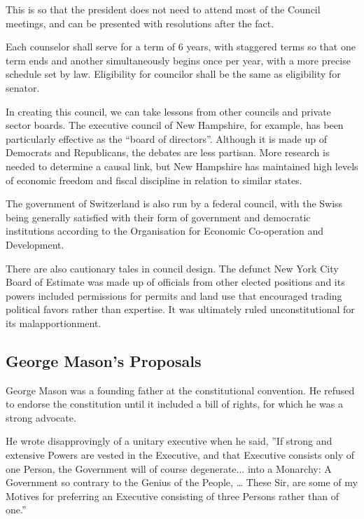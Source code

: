 \documentclass{article}
\begin{document}
This is so that the president does not need to attend most of the Council meetings, and can be presented with resolutions after the fact.

\begin{quoting}
Each counselor shall serve for a term of 6 years, with staggered terms so that one term ends and another simultaneously begins once per year, with a more precise schedule set by law. Eligibility for councilor shall be the same as eligibility for senator.
\end{quoting}

In creating this council, we can take lessons from other councils and private sector boards\cite{Khanna}. The executive council of New Hampshire, for example, has been particularly effective as the “board of directors”\cite{Hahn-Burkett}. Although it is made up of Democrats and Republicans, the debates are less partisan\cite{Timmins}. More research is needed to determine a causal link, but New Hampshire has maintained high levels of economic freedom and fiscal discipline in relation to similar states\cite{Ruger}.

The government of Switzerland is also run by a federal council, with the Swiss being generally satisfied with their form of government and democratic institutions according to the Organisation for Economic Co-operation and Development\cite{Kaufman}.

There are also cautionary tales in council design. The defunct New York City Board of Estimate was made up of officials from other elected positions and its powers included permissions for permits and land use that encouraged trading political favors rather than expertise\cite{Purnick}. It was ultimately ruled unconstitutional for its malapportionment\cite{Board_of_Estimate}.

\subsection{George Mason's Proposals}

George Mason was a founding father at the constitutional convention. He refused to endorse the constitution until it included a bill of rights, for which he was a strong advocate.

He wrote disapprovingly of a unitary executive when he said, ”If strong and extensive Powers are vested in the Executive, and that Executive consists only of one Person, the Government will of course degenerate... into a Monarchy: A Government so contrary to the Genius of the People, … These Sir, are some of my Motives for preferring an Executive consisting of three Persons rather than of one.”\cite{Mason}
\end{document}
